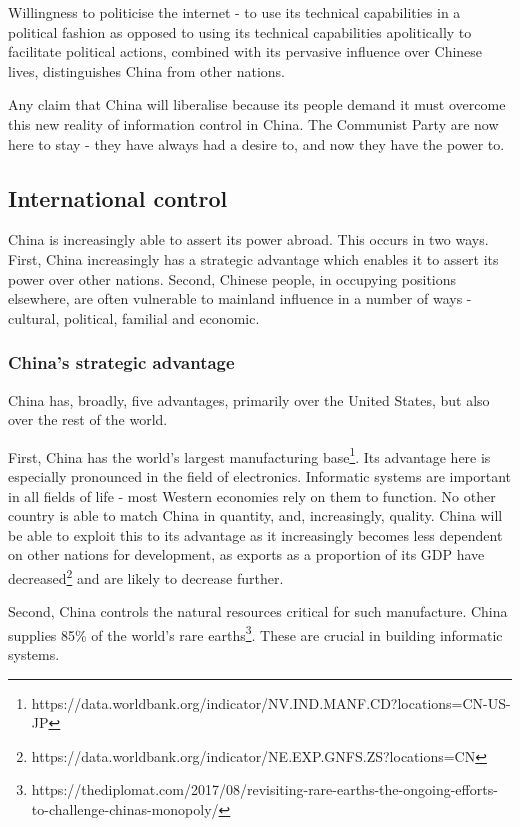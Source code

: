 	Willingness to politicise the internet - to use its technical
	capabilities in a political fashion as opposed to using its technical
	capabilities apolitically to facilitate political actions, combined with
	its pervasive influence over Chinese lives, distinguishes China from other nations.

	Any claim that China will liberalise because its people demand it must
	overcome this new reality of information control in China. The Communist
	Party are now here to stay - they have always had a desire to, and now
	they have the power to.


\subsection{International control}\label{international-control}


	China is increasingly able to assert its power abroad. This occurs in
	two ways. First, China increasingly has a strategic advantage which
	enables it to assert its power over other nations. Second, Chinese
	people, in occupying positions elsewhere, are often vulnerable to
	mainland influence in a number of ways - cultural, political, familial
	and economic.


\subsubsection{China's strategic
	advantage}\label{chinas-strategic-advantage}


	China has, broadly, five advantages, primarily over the United States,
	but also over the rest of the world.

	First, China has the world's largest manufacturing base\footnote{https://data.worldbank.org/indicator/NV.IND.MANF.CD?locations=CN-US-JP}.
	Its advantage here is especially pronounced in the field of electronics.
	Informatic systems are important in all fields of life - most Western
	economies rely on them to function. No other country is able to match
	China in quantity, and, increasingly, quality. China will be able to
	exploit this to its advantage as it increasingly becomes less dependent
	on other nations for development, as exports as a proportion of its GDP
	have decreased\footnote{https://data.worldbank.org/indicator/NE.EXP.GNFS.ZS?locations=CN}
	and are likely to decrease further.

	Second, China controls the natural resources critical for such
	manufacture. China supplies 85\% of the world's rare earths\footnote{https://thediplomat.com/2017/08/revisiting-rare-earths-the-ongoing-efforts-to-challenge-chinas-monopoly/}.
	These are crucial in building informatic systems.

